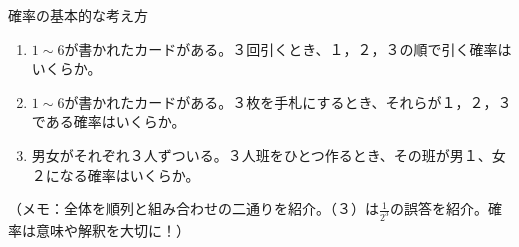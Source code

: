 \documentclass[12pt,a4paper]{jsarticle}
\begin{document}
確率の基本的な考え方
\begin{enumerate}
    \item $1\sim6$が書かれたカードがある。３回引くとき、１，２，３の順で引く確率はいくらか。
    \item $1\sim6$が書かれたカードがある。３枚を手札にするとき、それらが１，２，３である確率はいくらか。
    \item 男女がそれぞれ３人ずついる。３人班をひとつ作るとき、その班が男１、女２になる確率はいくらか。
\end{enumerate}
（メモ：全体を順列と組み合わせの二通りを紹介。（３）は$\frac{1}{2^3}$の誤答を紹介。確率は意味や解釈を大切に！）
\end{document}
